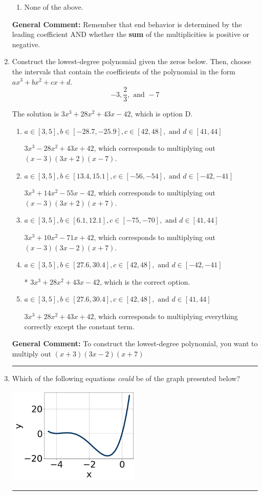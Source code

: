 \documentclass{extbook}[14pt]
\newcommand{\litem}[1]{\item #1

\rule{\textwidth}{0.4pt}}
\begin{document}
\begin{enumerate}
{\begin{enumerate}[label=\Alph*.]
\begin{multicols}{2}
\end{multicols}\item None of the above.\end{enumerate}
\textbf{General Comment:} Remember that end behavior is determined by the leading coefficient AND whether the \textbf{sum} of the multiplicities is positive or negative.
}
\litem{
Construct the lowest-degree polynomial given the zeros below. Then, choose the intervals that contain the coefficients of the polynomial in the form $ax^3+bx^2+cx+d$.
\[ -3, \frac{2}{3}, \text{ and } -7 \]

The solution is \( 3x^{3} +28 x^{2} +43 x -42 \), which is option D.\begin{enumerate}[label=\Alph*.]
\item \( a \in [3, 5], b \in [-28.7, -25.9], c \in [42, 48], \text{ and } d \in [41, 44] \)

$3x^{3} -28 x^{2} +43 x + 42$, which corresponds to multiplying out $(x -3)(3x + 2)(x -7)$.
\item \( a \in [3, 5], b \in [13.4, 15.1], c \in [-56, -54], \text{ and } d \in [-42, -41] \)

$3x^{3} +14 x^{2} -55 x -42$, which corresponds to multiplying out $(x -3)(3x + 2)(x + 7)$.
\item \( a \in [3, 5], b \in [6.1, 12.1], c \in [-75, -70], \text{ and } d \in [41, 44] \)

$3x^{3} +10 x^{2} -71 x + 42$, which corresponds to multiplying out $(x -3)(3x -2)(x + 7)$.
\item \( a \in [3, 5], b \in [27.6, 30.4], c \in [42, 48], \text{ and } d \in [-42, -41] \)

* $3x^{3} +28 x^{2} +43 x -42$, which is the correct option.
\item \( a \in [3, 5], b \in [27.6, 30.4], c \in [42, 48], \text{ and } d \in [41, 44] \)

$3x^{3} +28 x^{2} +43 x + 42$, which corresponds to multiplying everything correctly except the constant term.
\end{enumerate}

\textbf{General Comment:} To construct the lowest-degree polynomial, you want to multiply out $(x + 3)(3x -2)(x + 7)$
}
\litem{
Which of the following equations \textit{could} be of the graph presented below?

\begin{center}
    \includegraphics[width=0.5\textwidth]{../Figures/polyGraphToFunctionCopyC.png}
\end{center}




}
\end{enumerate}
\end{document}

